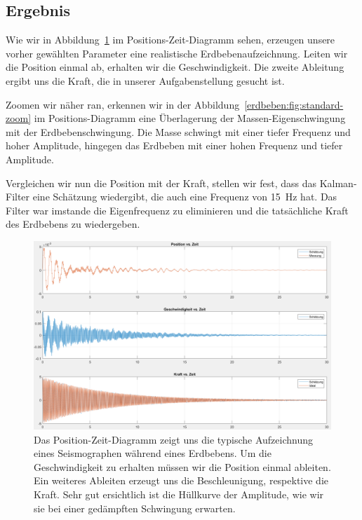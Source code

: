 \subsection*{Ergebnis}

Wie wir in Abbildung~\ref{erdbeben:fig:standard-alles} im Positions-Zeit-Diagramm sehen, erzeugen unsere vorher gewählten Parameter eine realistische Erdbebenaufzeichnung.
Leiten wir die Position einmal ab, erhalten wir die Geschwindigkeit.
Die zweite Ableitung ergibt uns die Kraft, die in unserer Aufgabenstellung gesucht ist.

Zoomen wir näher ran, erkennen wir in der Abbildung~\ref{erdbeben:fig:standard-zoom} im Positions-Diagramm eine Überlagerung der Massen-Eigenschwingung mit der Erdbebenschwingung.
Die Masse schwingt mit einer tiefer Frequenz und hoher Amplitude, hingegen das Erdbeben mit einer hohen Frequenz und tiefer Amplitude.

Vergleichen wir nun die Position mit der Kraft, stellen wir fest, dass das Kalman-Filter eine Schätzung wiedergibt, die auch eine Frequenz von \SI{15}{\hertz} hat.
Das Filter war imstande die Eigenfrequenz zu eliminieren und die tatsächliche Kraft des Erdbebens zu wiedergeben.

\begin{figure}
	\begin{center}
		\includegraphics[width=\linewidth,keepaspectratio]{papers/erdbeben/Standard_alles.PNG}
		\caption{Das Position-Zeit-Diagramm zeigt uns die typische Aufzeichnung eines Seismographen während eines Erdbebens. Um die Geschwindigkeit zu erhalten müssen wir die Position einmal ableiten. Ein weiteres Ableiten erzeugt uns die Beschleunigung, respektive die Kraft. Sehr gut ersichtlich ist die Hüllkurve der Amplitude, wie wir sie bei einer gedämpften Schwingung erwarten.}
    \label{erdbeben:fig:standard-alles}
	\end{center}
\end{figure}

